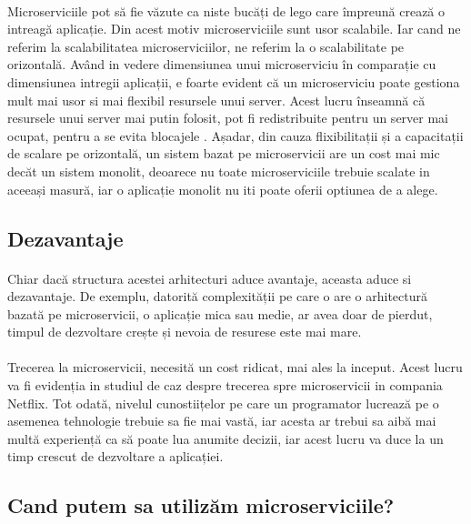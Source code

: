 \documentclass[12pt]{report}
\begin{document}
  	\paragraph{}Microserviciile pot să fie văzute ca niste bucăți de lego care împreună crează o intreagă aplicație. Din acest motiv microserviciile sunt usor scalabile. Iar cand ne referim la scalabilitatea microserviciilor, ne referim la o scalabilitate pe orizontală. Având in vedere dimensiunea unui microserviciu în comparație cu dimensiunea intregii aplicații, e foarte evident că un microserviciu poate gestiona mult mai usor si mai flexibil resursele unui server. Acest lucru înseamnă că resursele unui server mai putin folosit, pot fi redistribuite pentru un server mai ocupat, pentru a se evita blocajele \cite{singleton2016economics}. Așadar, din cauza flixibilitații și a capacitații de scalare pe orizontală, un sistem bazat pe microservicii are un cost mai mic decăt un sistem monolit, deoarece nu toate microserviciile trebuie scalate in aceeași masură, iar o aplicație monolit nu iti poate oferii optiunea de a alege. \cite{newman2015building}
  	\subsection{Dezavantaje}
  	\paragraph{}Chiar dacă structura acestei arhitecturi aduce avantaje, aceasta aduce si dezavantaje. De exemplu, datorită complexității pe care o are o arhitectură bazată pe microservicii, o aplicație mica sau medie, ar avea doar de pierdut, timpul de dezvoltare crește și nevoia de resurese este mai mare.
  	\paragraph{}Trecerea la microservicii, necesită un cost ridicat, mai ales la inceput. Acest lucru va fi evidenția in studiul de caz despre trecerea spre microservicii in compania Netflix. Tot odată, nivelul cunostiițelor pe care un programator lucrează pe o asemenea tehnologie trebuie sa fie mai vastă, iar acesta ar trebui sa aibă mai multă experiență ca să poate lua anumite decizii, iar acest lucru va duce la un timp crescut de dezvoltare a aplicației.
  	\subsection{Cand putem sa utilizăm microserviciile?}
\end{document}
